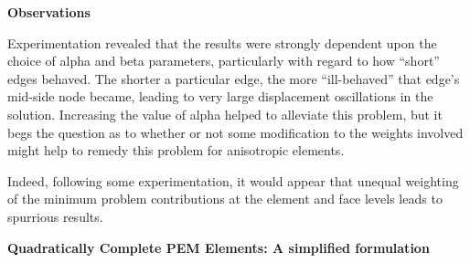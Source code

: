 \documentclass[11pt]{article} %
\begin{document}
\begin{center}
\textbf{Observations}
\end{center}

Experimentation revealed that the results were strongly dependent upon the choice of alpha and beta parameters, particularly with regard to how ``short'' edges behaved. The shorter a particular edge, the more ``ill-behaved'' that edge's mid-side node became, leading to very large displacement oscillations in the solution. Increasing the value of alpha helped to alleviate this problem, but it begs the question as to whether or not some modification to the weights involved might help to remedy this problem for anisotropic elements.

Indeed, following some experimentation, it would appear that unequal weighting of the minimum problem contributions at the element and face levels leads to spurrious results.

\begin{center}
\textbf{Quadratically Complete PEM Elements: A simplified formulation}
\end{center}
\end{document}
